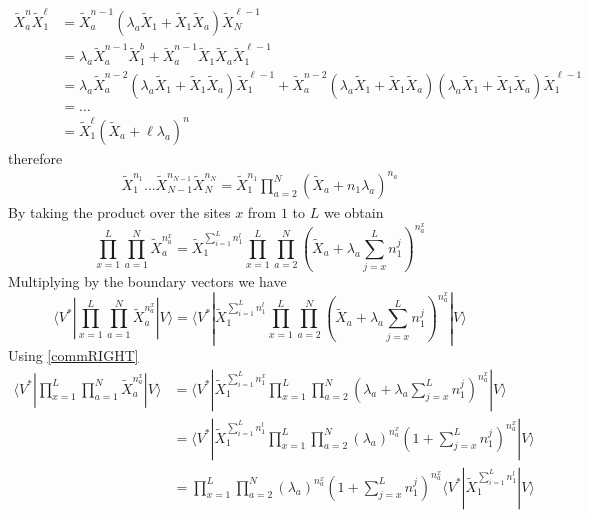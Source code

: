 \documentclass[10pt]{article}
\numberwithin{equation}{section}
\numberwithin{equation}{subsection}
\begin{document}
\begin{align*}
	\widetilde{X}_{a}^{n}\widetilde{X}_{1}^{\ell}&=\widetilde{X}_{a}^{n-1}\left(\lambda_{a}\widetilde{X}_{1}+\widetilde{X}_{1}\widetilde{X}_{a}\right)\widetilde{X}_{N}^{\ell-1}
	\\&=\lambda_{a}\widetilde{X}_{a}^{n-1}\widetilde{X}_{1}^{b}+\widetilde{X}_{a}^{n-1}\widetilde{X}_{1}\widetilde{X}_{a}\widetilde{X}_{1}^{\ell-1}
	\\&=
	\lambda_{a}\widetilde{X}_{a}^{n-2}\left(\lambda_{a}\widetilde{X}_{1}+\widetilde{X}_{1}\widetilde{X}_{a}\right)\widetilde{X}_{1}^{\ell-1}+\widetilde{X}_{a}^{n-2}\left(\lambda_{a}\widetilde{X}_{1}+\widetilde{X}_{1}\widetilde{X}_{a}\right)\left(\lambda_{a}\widetilde{X}_{1}+\widetilde{X}_{1}\widetilde{X}_{a}\right)\widetilde{X}_{1}^{\ell -1}
	\\&=\ldots\\&=
	\widetilde{X}_{1}^{\ell}\left(\widetilde{X}_{a}+\ell\lambda_{a}\right)^{n}
\end{align*}
therefore 
\begin{align*}
	\widetilde{X}_{1}^{n_{1}}\ldots\widetilde{X}_{N-1}^{n_{N-1}}\widetilde{X}_{N}^{n_{N}}=\widetilde{X}_{1}^{n_{1}}\prod_{a=2}^{N}\left(\widetilde{X}_{a}+n_{1}\lambda_{a}\right)^{n_{a}}
\end{align*}
By taking the product over the sites $x$ from $1$ to $L$ we obtain 
\begin{equation}
	\prod_{x=1}^{L}\prod_{a=1}^{N}\widetilde{X}_{a}^{n_{a}^{x}}=\widetilde{X}_{1}^{\sum_{i=1}^{L}n_{1}^{l}}\prod_{x=1}^{L}\prod_{a=2}^{N}\left(\widetilde{X}_{a}+\lambda_{a}\sum_{j=x}^{L}n_{1}^{j}\right)^{n_{a}^{x}}
\end{equation}
Multiplying by the boundary vectors we have 
\begin{equation}
	\langle V^{*}|\prod_{x=1}^{L}\prod_{a=1}^{N}\widetilde{X}_{a}^{n_{a}^{x}}
	|V \rangle=\langle V^{*}|\widetilde{X}_{1}^{\sum_{i=1}^{L}n_{1}^{l}}\prod_{x=1}^{L}\prod_{a=2}^{N}\left(\widetilde{X}_{a}+\lambda_{a}\sum_{j=x}^{L}n_{1}^{j}\right)^{n_{a}^{x}}|V\rangle
\end{equation}
Using \eqref{commRIGHT}
\begin{align*}
	\langle V^{*}|\prod_{x=1}^{L}\prod_{a=1}^{N}\widetilde{X}_{a}^{n_{a}^{x}}
	|V \rangle&=\langle V^{*}|\widetilde{X}_{1}^{\sum_{i=1}^{L}n_{1}^{x}}\prod_{x=1}^{L}\prod_{a=2}^{N}\left(\lambda_{a}+\lambda_{a}\sum_{j=x}^{L}n_{1}^{j}\right)^{n_{a}^{x}}|V\rangle
	\\&=
	\langle V^{*}|\widetilde{X}_{1}^{\sum_{i=1}^{L}n_{1}^{l}}\prod_{x=1}^{L}\prod_{a=2}^{N}\left(\lambda_{a}\right)^{n_{a}^{x}}\left(1+\sum_{j=x}^{L}n_{1}^{j}\right)^{n_{a}^{x}}|V\rangle
	\\&=
	\prod_{x=1}^{L}\prod_{a=2}^{N}\left(\lambda_{a}\right)^{n_{a}^{x}}\left(1+\sum_{j=x}^{L}n_{1}^{j}\right)^{n_{a}^{x}}\langle V^{*}|\widetilde{X}_{1}^{\sum_{i=1}^{L}n_{1}^{l}}|V\rangle
\end{align*}
\end{document}
